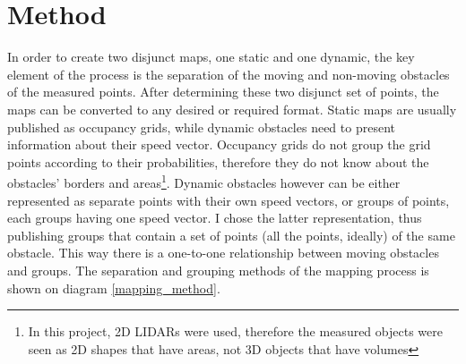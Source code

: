 \section{Method}
In order to create two disjunct maps, one static and one dynamic, the key element of the process is the separation of the moving and non-moving obstacles of the measured points. After determining these two disjunct set of points, the maps can be converted to any desired or required format. Static maps are usually published as occupancy grids, while dynamic obstacles need to present information about their speed vector. Occupancy grids do not group the grid points according to their probabilities, therefore they do not know about the obstacles' borders and areas\footnote{In this project, 2D LIDARs were used, therefore the measured objects were seen as 2D shapes that have areas, not 3D objects that have volumes}. Dynamic obstacles however can be either represented as separate points with their own speed vectors, or groups of points, each groups having one speed vector. I chose the latter representation, thus publishing groups that contain a set of points (all the points, ideally) of the same obstacle. This way there is a one-to-one relationship between moving obstacles and groups. The separation and grouping methods of the mapping process is shown on diagram \ref{mapping_method}.


